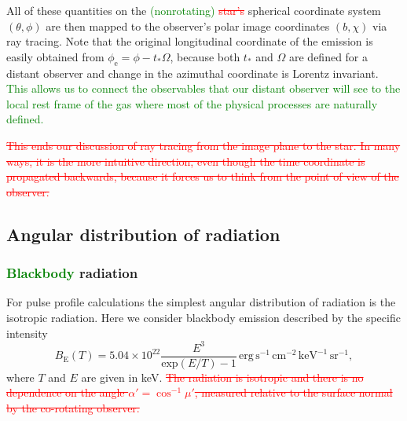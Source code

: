 \documentclass{aa}
\newcommand{\refe}[1]{\textcolor{green}{{#1}}}
\newcommand{\refedel}[1]{\textcolor{red}{\sout{#1}}}
\begin{document}
All of these quantities on the \refe{(nonrotating)} \refedel{star's} spherical coordinate system $(\theta, \phi)$ are then mapped to the observer's polar image coordinates $(b, \chi)$ via ray tracing.
Note that the original longitudinal coordinate of the emission is easily obtained from $\phi_{\mathrm{e}} = \phi - t_* \Omega$, because both $t_*$ and $\Omega$ are defined for a distant observer and change in the azimuthal coordinate is Lorentz invariant.
\refe{This allows us to connect the observables that our distant observer will see to the local rest frame of the gas where most of the physical processes are naturally defined.}

\refedel{
This ends our discussion of ray tracing from the image plane to the star.
In many ways, it is the more intuitive direction, even though the time coordinate is propagated backwards, because it forces us to think from the point of view of the observer.
}



\subsection{Angular distribution of radiation}\label{sect:angular_distr}
\subsubsection{\refe{Blackbody} radiation}

For pulse profile calculations the simplest angular distribution of radiation is the isotropic radiation.
Here we consider blackbody emission described by the specific intensity
\begin{equation}
  B_{\mathrm{E}}(T) = 5.04 \times 10^{22} \frac{E^3}{\mathrm{exp}(E/T) -1} \,\mathrm{erg}\,\mathrm{s}^{-1}\,\mathrm{cm}^{-2}\,\mathrm{keV}^{-1}\,\mathrm{sr}^{-1},
\end{equation}
where $T$ and $E$ are given in keV.
\refedel{The radiation is isotropic and there is no dependence on the angle $\alpha'=\cos^{-1}\mu'$, measured relative to the surface normal by the co-rotating observer.}
\end{document}
